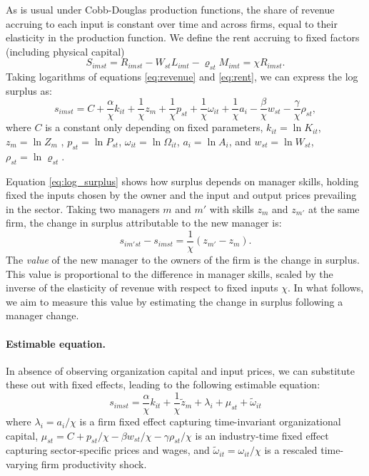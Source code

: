 As is usual under Cobb-Douglas production functions, the share of revenue accruing to each input is constant over time and across firms, equal to their elasticity in the production function. We define the rent accruing to fixed factors (including physical capital) 
\begin{equation}\label{eq:rent}
S_{imst} = R_{imst} - W_{st}L_{imt} - \varrho_{st}M_{imt} = \chi R_{imst}.
\end{equation}
Taking logarithms of equations \eqref{eq:revenue} and \eqref{eq:rent}, we can express the log surplus as:      
\begin{equation}\label{eq:log_surplus}
s_{imst} = C+\frac\alpha\chi k_{it} + \frac1\chi {z}_{m} + \frac1\chi p_{st} + \frac1\chi{\omega}_{it}+\frac1\chi a_i 
- \frac\beta\chi w_{st} - \frac\gamma\chi \rho_{st},
\end{equation}
where $C$ is a constant only depending on fixed parameters, $k_{it} = \ln K_{it}$, ${z}_{m} = \ln Z_m$ , $ p_{st} = \ln P_{st}$, ${\omega}_{it} = \ln\Omega_{it}$, $a_i = \ln A_i$, and $w_{st} = \ln W_{st}$, $\rho_{st} = \ln \varrho_{st}$. 

Equation \eqref{eq:log_surplus} shows how surplus depends on manager skills, holding fixed the inputs chosen by the owner and the input and output prices prevailing in the sector. Taking two managers $m$ and $m'$ with skills ${z}_m$ and ${z}_{m'}$ at the same firm, the change in surplus attributable to the new manager is:
\begin{equation}\label{eq:manager_change}
s_{im'st} - s_{imst} = \frac1\chi({z}_{m'} - {z}_{m}).
\end{equation}
The \emph{value} of the new manager to the owners of the firm is the change in surplus. This value is proportional to the difference in manager skills, scaled by the inverse of the elasticity of revenue with respect to fixed inputs $\chi$. In what follows, we aim to measure this value by estimating the change in surplus following a manager change.

\paragraph{Estimable equation.} In absence of observing organization capital and input prices, we can substitute these out with fixed effects, leading to the following estimable equation:
\begin{equation}\label{eq:estimation}
s_{imst} = \frac\alpha\chi k_{it}  + \frac1\chi\tilde{z}_m + \lambda_i + \mu_{st} + \tilde \omega_{it}
\end{equation}
where $\lambda_i = a_i/\chi$ is a firm fixed effect capturing time-invariant organizational capital, $\mu_{st} = C + p_{st}/\chi - \beta w_{st}/\chi - \gamma\rho_{st}/\chi$ is an industry-time fixed effect capturing sector-specific prices and wages, and $\tilde\omega_{it} = \omega_{it}/\chi$ is a rescaled time-varying firm productivity shock. 

